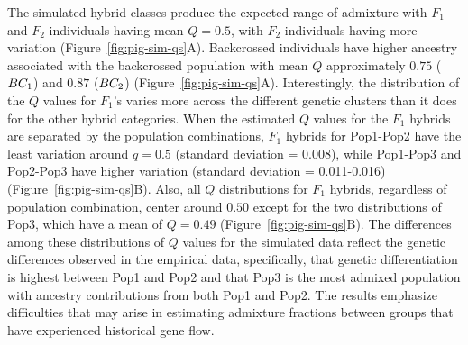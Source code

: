 {The simulated hybrid classes produce
the expected range of admixture with $F_1$ and $F_2$ individuals having mean $Q=0.5$, with $F_2$ individuals having
more variation (Figure~\ref{fig:pig-sim-qs}A).
Backcrossed individuals have higher ancestry associated with the backcrossed population with mean $Q$
approximately $0.75$ ($BC_1$) and $0.87$ ($BC_2$) (Figure~\ref{fig:pig-sim-qs}A). Interestingly, the distribution of the $Q$ values for $F_1$'s varies more across the different genetic clusters than it does for the other
hybrid categories.
When the estimated $Q$ values for the $F_1$ hybrids are separated by the population combinations,
$F_1$ hybrids for Pop1-Pop2 have the least variation around $q=0.5$ (standard deviation
= 0.008), while Pop1-Pop3 and Pop2-Pop3
have higher variation (standard deviation = 0.011-0.016) (Figure~\ref{fig:pig-sim-qs}B). Also, all $Q$
distributions for $F_1$ hybrids, regardless of population combination, center around
$0.50$ except for the two distributions
of Pop3, which have a mean of $Q=0.49$ (Figure~\ref{fig:pig-sim-qs}B).
The differences among these
distributions of $Q$ values for the simulated data reflect the genetic differences observed
in the empirical data, specifically, that genetic differentiation is highest between Pop1 and Pop2 and that
Pop3 is the most admixed population with ancestry contributions from both Pop1 and Pop2.
The results emphasize difficulties that may arise in estimating admixture fractions between
groups that have experienced historical gene flow.



}
